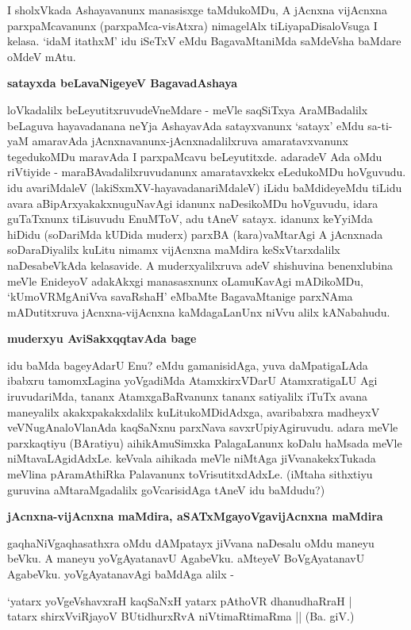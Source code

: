 I sholxVkada Ashayavanunx manasisxge taMdukoMDu, A jAcnxna vijAcnxna parxpaMcavanunx (parxpaMca-visAtxra) nimagelAlx tiLiyapaDisaloVsuga I kelasa. `idaM itathxM' idu iSeTxV eMdu BagavaMtaniMda saMdeVsha baMdare oMdeV mAtu.

\noindent
\textbf{satayxda beLavaNigeyeV BagavadAshaya}\label{page72}

loVkadalilx beLeyutitxruvudeVneMdare - meVle saqSiTxya AraMBadalilx beLaguva hayavadanana neYja AshayavAda satayxvanunx `satayx' eMdu sa-ti-yaM amaravAda jAcnxnavanunx-jAcnxnadalilxruva amaratavxvanunx tegedukoMDu maravAda I parxpaMcavu beLeyutitxde. adaradeV Ada oMdu riVtiyide - maraBAvadalilxruvudanunx amaratavxkekx eLedukoMDu hoVguvudu. idu avariMdaleV (lakiSxmXV-hayavadanariMdaleV) iLidu baMdideyeMdu tiLidu avara aBipArxyakakxnuguNavAgi idanunx naDesikoMDu hoVguvudu, idara guTaTxnunx tiLisuvudu EnuMToV, adu tAneV satayx. idanunx keYyiMda hiDidu (soDariMda kUDida muderx) parxBA (kara)vaMtarAgi A jAcnxnada soDaraDiyalilx kuLitu nimamx vijAcnxna maMdira keSxVtarxdalilx naDesabeVkAda kelasavide. A muderxyalilxruva adeV shishuvina benenxlubina meVle EnideyoV adakAkxgi manasasxnunx oLamuKavAgi mADikoMDu, `kUmoVRMgAniVva savaRshaH'\label{73} eMbaMte BagavaMtanige parxNAma mADutitxruva jAcnxna-vijAcnxna kaMdagaLanUnx niVvu alilx kANabahudu.

\noindent
\textbf{muderxyu AviSakxqqtavAda bage}\label{page73}

idu baMda bageyAdarU Enu? eMdu gamanisidAga, yuva daMpatigaLAda ibabxru tamomxLagina yoVgadiMda AtamxkirxVDarU AtamxratigaLU Agi iruvudariMda, tananx AtamxgaBaRvanunx tananx satiyalilx iTuTx avana maneyalilx akakxpakakxdalilx kuLitukoMDidAdxga, avaribabxra madheyxV veVNugAnaloVlanAda kaqSaNxnu parxNava savxrUpiyAgiruvudu. adara meVle parxkaqtiyu (BAratiyu) aihikAmuSimxka PalagaLanunx koDalu haMsada meVle niMtavaLAgidAdxLe. keVvala aihikada meVle niMtAga jiVvanakekxTukada meVlina pAramAthiRka Palavanunx toVrisutitxdAdxLe. (iMtaha sithxtiyu guruvina aMtaraMgadalilx goVcarisidAga tAneV idu baMdudu?)

\noindent
\textbf{jAcnxna-vijAcnxna maMdira, aSATxMgayoVgavijAcnxna maMdira}\label{page73}

gaqhaNiVgaqhasathxra oMdu dAMpatayx jiVvana naDesalu oMdu maneyu beVku. A maneyu yoVgAyatanavU AgabeVku. aMteyeV BoVgAyatanavU AgabeVku. yoVgAyatanavAgi baMdAga alilx -

\begin{shloka}
`yatarx yoVgeVshavxraH kaqSaNxH yatarx pAthoVR dhanudhaRraH |\\\label{73}
tatarx shirxVviRjayoV BUtidhurxRvA niVtimaRtimaRma || (Ba. giV.)
\end{shloka}

